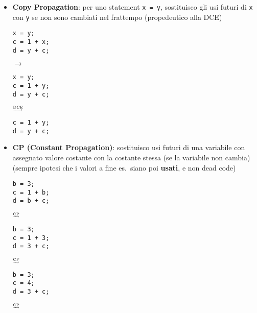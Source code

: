 \begin{itemize}
\begin{minipage}[c]{.25\textwidth}
\begin{lstlisting}
  \end{lstlisting}
  \end{minipage}
\item \textbf{Copy Propagation}: per uno statement \lstinline|x = y|, sostituisco gli usi futuri di \lstinline|x| con \lstinline|y| se non sono cambiati nel frattempo (propedeutico alla DCE)\\
  \begin{minipage}[c]{.25\textwidth}
  \begin{lstlisting}
x = y;
c = 1 + x;
d = y + c;\end{lstlisting}
  \end{minipage}
  \hfill $\rightarrow$ \hfill
  \begin{minipage}[c]{.25\textwidth}
  \begin{lstlisting}
x = y;
c = 1 + y;
d = y + c;\end{lstlisting}
  \end{minipage}
  \hfill $\tiny\underrightarrow{\text{DCE}}$ \hfill
  \begin{minipage}[c]{.25\textwidth}
  \begin{lstlisting}
c = 1 + y;
d = y + c;\end{lstlisting}
  \end{minipage}
\item \textbf{CP (Constant Propagation)}: sostituisco usi futuri di una variabile con assegnato valore costante con la costante stessa (se la variabile non cambia) (sempre ipotesi che i valori a fine es.~siano poi \textbf{usati}, e non dead code)\\
  \begin{minipage}[c]{.25\textwidth}
  \begin{lstlisting}
b = 3;
c = 1 + b;
d = b + c;\end{lstlisting}
  \end{minipage}
  \hfill $\tiny\underrightarrow{\text{CP}}$ \hfill
  \begin{minipage}[c]{.25\textwidth}
  \begin{lstlisting}
b = 3;
c = 1 + 3;
d = 3 + c;\end{lstlisting}
  \end{minipage}
  \hfill $\tiny\underrightarrow{\text{CF}}$ \hfill
  \begin{minipage}[c]{.25\textwidth}
  \begin{lstlisting}
b = 3;
c = 4;
d = 3 + c;\end{lstlisting}
  \end{minipage}
  \hfill $\tiny\underrightarrow{\text{CP}}$ \hfill


\end{itemize}
